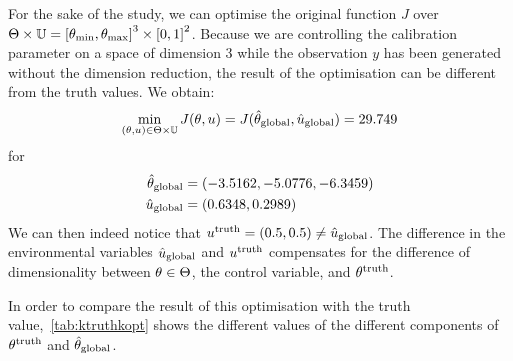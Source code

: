 \documentclass[../../Main_ManuscritThese.tex]{subfiles}
\begin{document}
For the sake of the study, we can optimise the original function $J$
over
$\Kspace\times \Uspace = \interval{\kk_{\min}}{\kk_{\max}}^3 \times
\interval{0}{1}^2$.  Because we are controlling the calibration
parameter on a space of dimension 3 while the observation $y$ has been
generated without the dimension reduction, the result of the
optimisation can be different from the truth values.
 We obtain:
\begin{equation}
  \min_{(\kk,\uu) \in \Kspace \times \Uspace} J(\kk, \uu) = J(\hat{\kk}_{\mathrm{global}}, \hat{\uu}_{\mathrm{global}})= \num{29.749}
\end{equation}
for
\begin{align}
  \hat{\kk}_{\mathrm{global}}                     & = (\num[round-mode=places,round-precision=4]{-3.5161661} , \num[round-mode=places,round-precision=4]{-5.07764701}, \num[round-mode=places,round-precision=4]{-6.34588442})                                                                                                            \\\hat{\uu}_{\mathrm{global}} & = (\num[round-mode=places,round-precision=4]{0.6347829},\num[round-mode=places,round-precision=4]{0.29890637})
\end{align}
We can then indeed notice that
$\uu^{\mathrm{truth}}=(\num{0.5},\num{0.5}) \neq
\hat{\uu}_{\mathrm{global}}$. The difference in the environmental
variables $\hat{\uu}_{\mathrm{global}}$ and $\uu^{\mathrm{truth}}$
compensates for the difference of dimensionality between
$\kk\in\Kspace$, the control variable, and $\kk^{\mathrm{truth}}$.


In order to compare the result of this optimisation with the truth
value,~\cref{tab:ktruthkopt} shows the different values of the
different components of $\kk^{\mathrm{truth}}$ and
$\hat{\kk}_{\mathrm{global}}$.
\end{document}
